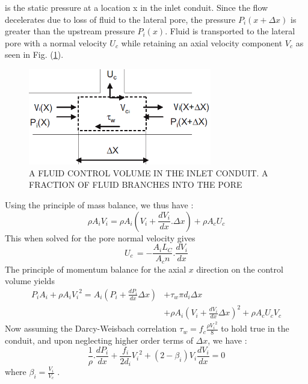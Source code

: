 \documentclass[twocolumn,10pt,cleanfoot]{ihmtc}
\begin{document}
is the static pressure at a location x in the inlet conduit. Since
the flow decelerates due to loss of fluid to the lateral pore, the
pressure $P_i(x+\Delta x)$ is greater than the upstream pressure
$P_i(x)$. Fluid is transported to the lateral pore with a normal
velocity $U_c$ while retaining an axial velocity component $V_c$
as seen in Fig. (\ref{inletcon}). 
%
\begin{figure}[ht]
\centerline{\includegraphics[width=80mm,scale=0.50]{inletcon.PNG}}
\vspace{-1.5ex}
\caption{\small{A FLUID CONTROL VOLUME IN THE INLET CONDUIT. A FRACTION OF FLUID BRANCHES INTO THE PORE}}
\label{inletcon}
\end{figure}
%
Using the principle of mass balance, we thus
have : %
\begin{equation} \label{in-mass}
\rho {{A}_{i}}{{V}_{i}}=\rho {{A}_{i}}({{V}_{i}}+\frac{d{{V}_{i}}}{dx}.\Delta x)+\rho {{A}_{c}}{{U}_{c}}
\end{equation}
%
This when solved for the pore normal velocity gives
%
\begin{equation} \label{in-uc}
{{U}_{c}}\,=-\frac{{{A}_{i}}L_C}{{{A}_{c}}n}.\frac{d{{V}_{i}}}{dx} 
\end{equation}
%
The principle of momentum balance for the axial $x$ direction on the control volume yields
%
\begin{equation} \label{in-mom}
\begin{split}
{{P}_{i}}A_i+\rho {{A}_{i}}{{V}_{i}}^{2}={A}_{i}({{P}_{i}}+\frac{d{{P}_{i}}}{dx}\Delta x) & +{\tau }_{w}\pi {d}_{i}\Delta x \\
& +\rho {A}_{i}{({{V}_{i}}+\frac{d{{V}_{i}}}{dx}\Delta x)}^{2}+\rho {{A}_{c}}{{U}_{c}}{{V}_{c}}
\end{split}
\end{equation}
%
Now assuming the Darcy-Weisbach correlation ${{\tau }_{w}}=f_c\frac{\rho {{V}_{i}}^{2}}{8}$
to hold true in the conduit, and upon neglecting higher order terms
of $\Delta x$, we have :
%
\begin{equation} \label{in-mom-final}
\frac{1}{\rho }.\frac{d{{P}_{i}}}{dx}+\frac{{{f}_{i}}}{2{{d}_{i}}}{{V}_{i}}^{2}+(2-{{\beta }_{i}}){{V}_{i}}\frac{d{{V}_{i}}}{dx}=0
\end{equation} where $\beta_i=\frac{V_i}{V_c}$ . 
\end{document}
